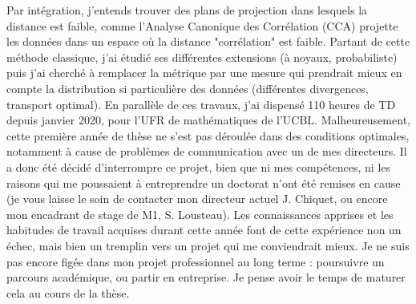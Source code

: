 \documentclass[a4paper,11pt]{article}
\begin{document}
%
Par intégration, j'entends trouver des plans de projection dans lesquels la distance est faible, comme l'Analyse Canonique des Corrélation (CCA) projette les données dans un espace où la distance "corrélation" est faible. Partant de cette méthode classique, j'ai étudié ses différentes extensions (à noyaux, probabiliste) puis j'ai cherché à remplacer la métrique par une mesure qui prendrait mieux en compte la distribution si particulière des données (différentes divergences, transport optimal). 
En parallèle de ces travaux, j'ai dispensé 110 heures de TD depuis janvier 2020, pour l'UFR de mathématiques de l'UCBL. 
Malheureusement, cette première année de thèse ne s'est pas déroulée dans des conditions optimales, notamment à cause de problèmes de communication avec un de mes directeurs. 
%
Il a donc été décidé d'interrompre ce projet, bien que ni mes compétences, ni les raisons qui me poussaient à entreprendre un doctorat n'ont été remises en cause (je vous laisse le soin de contacter mon directeur actuel J. Chiquet, ou encore mon encadrant de stage de M1, S. Lousteau).
%
Les connaissances apprises et les habitudes de travail acquises durant cette année font de cette expérience non un échec, mais bien un tremplin vers un projet qui me conviendrait mieux. 
%
Je ne suis pas encore figée dans mon projet professionnel au long terme : poursuivre un parcours académique, ou partir en entreprise. Je pense avoir le temps de maturer cela au cours de la thèse. 
%
\\
\end{document}
